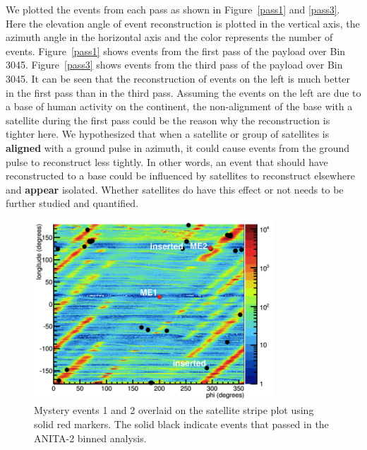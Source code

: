 We plotted the events from each pass as shown in Figure~\ref{pass1} and \ref{pass3}. Here the elevation angle of event reconstruction is plotted in the vertical axis, the azimuth angle in the horizontal axis and the color represents the number of events. Figure~\ref{pass1} shows events from the first pass of the payload over Bin 3045. Figure~\ref{pass3} shows events from the third pass of the payload over Bin 3045. It can be seen that the reconstruction of events on the left is much better in the first pass than in the third pass. Assuming the events on the left are due to a base of human activity on the continent, the non-alignment of the base with a satellite during the first pass could be the reason why the reconstruction is tighter here.
We hypothesized that when a satellite or group of satellites is {\bf aligned} with a ground pulse in azimuth, it could cause events from the ground pulse to reconstruct less tightly. In other words, an event that should have reconstructed to a base could be influenced by satellites to reconstruct elsewhere and {\bf appear} isolated. Whether satellites do have this effect or not needs to be further studied and quantified. 


\begin{figure}
\centering
\includegraphics[width=0.8\textwidth]{figures/me_stripe.png}
\caption{Mystery events 1 and 2 overlaid on the satellite stripe plot using solid red markers. The solid black indicate events that passed in the ANITA-2 binned analysis.}
\label{me_stripe}
\end{figure}


